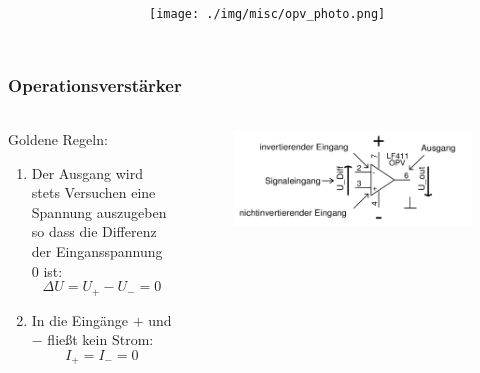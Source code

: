 \begin{frame}
\begin{columns}[c]
\begin{figure}[H]
\begin{center}
    \end{center}
    \end{figure}
    \begin{figure}[H]
    \begin{center}
            \texttt{[image: ./img/misc/opv\_photo.png]}
    \end{center}
    \end{figure}
    \end{columns}    
\end{frame}

\begin{frame}
    \frametitle{Operationsverstärker}
    \framesubtitle{}
    \begin{columns}[c]  
        \begin{block}{Goldene Regeln:}
             \begin{enumerate}
                 \item Der Ausgang wird stets Versuchen eine Spannung
                 auszugeben so dass die Differenz der Eingansspannung 0 ist:
                 \begin{equation*}
                     \Delta U = U_+ - U_- = 0
                 \end{equation*}
                 \item In die Eingänge $+$ und $-$ fließt kein Strom:
                 \begin{equation*}
                     I_+ = I_- = 0
                 \end{equation*}
             \end{enumerate}
        \end{block}
        \begin{figure}[H]
        \begin{center}
                \includegraphics[scale=0.2]{./img/misc/opv_schaltung.png}
        \end{center}
        \end{figure}
    \end{columns}
\end{frame}

